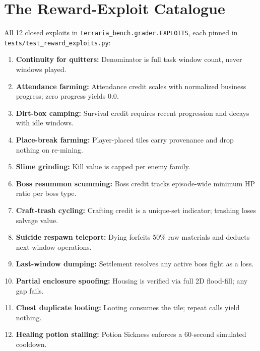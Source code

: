 \documentclass[10pt,letterpaper]{article}
\begin{document}
\section{The Reward-Exploit Catalogue}
\label{app:exploits}
All 12 closed exploits in \texttt{terraria\_bench.grader.EXPLOITS}, each pinned in \texttt{tests/test\_reward\_exploits.py}:
\begin{enumerate}[leftmargin=18pt,itemsep=2pt]
  \item \textbf{Continuity for quitters:} Denominator is full task window count, never windows played.
  \item \textbf{Attendance farming:} Attendance credit scales with normalized business progress; zero progress yields $0.0$.
  \item \textbf{Dirt-box camping:} Survival credit requires recent progression and decays with idle windows.
  \item \textbf{Place-break farming:} Player-placed tiles carry provenance and drop nothing on re-mining.
  \item \textbf{Slime grinding:} Kill value is capped per enemy family.
  \item \textbf{Boss resummon scumming:} Boss credit tracks episode-wide minimum HP ratio per boss type.
  \item \textbf{Craft-trash cycling:} Crafting credit is a unique-set indicator; trashing loses salvage value.
  \item \textbf{Suicide respawn teleport:} Dying forfeits 50\% raw materials and deducts next-window operations.
  \item \textbf{Last-window dumping:} Settlement resolves any active boss fight as a loss.
  \item \textbf{Partial enclosure spoofing:} Housing is verified via full 2D flood-fill; any gap fails.
  \item \textbf{Chest duplicate looting:} Looting consumes the tile; repeat calls yield nothing.
  \item \textbf{Healing potion stalling:} Potion Sickness enforces a 60-second simulated cooldown.
\end{enumerate}
\end{document}
